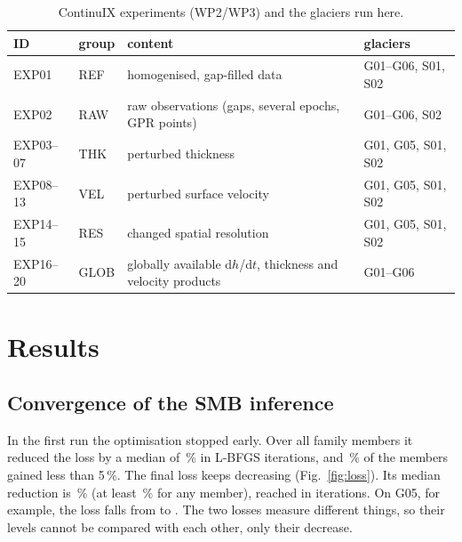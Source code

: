 \documentclass[10pt,a4paper]{article}
\begin{document}
\begin{table}[!htb]
\centering\small
\caption{ContinuIX experiments (WP2/WP3) and the glaciers run here.}
\label{tab:exp}
\begin{tabular}{lll l}
\toprule
ID & group & content & glaciers \\
\midrule
EXP01 & REF & homogenised, gap-filled data & G01--G06, S01, S02 \\
EXP02 & RAW & raw observations (gaps, several epochs, GPR points) & G01--G06, S02 \\
EXP03--07 & THK & perturbed thickness & G01, G05, S01, S02 \\
EXP08--13 & VEL & perturbed surface velocity & G01, G05, S01, S02 \\
EXP14--15 & RES & changed spatial resolution & G01, G05, S01, S02 \\
EXP16--20 & GLOB & globally available d$h$/d$t$, thickness and velocity products & G01--G06 \\
\bottomrule
\end{tabular}
\end{table}

\begin{table}[!htb]
\centering\small
\caption{Glaciers. Window = inversion period ($t_1$--$t_2$; a 10-yr window is assumed for the synthetic cases);
ice cells on the model grid; ``seg.'' = number of connected GPR profile segments.}
\label{tab:glaciers}
\setlength{\tabcolsep}{4pt}

\end{table}

\section{Results}

\subsection{Convergence of the SMB inference}
In the first run the optimisation stopped early. Over all  family members it reduced the loss by a median of
\,\% in  L-BFGS iterations, and \,\% of the members gained less
than 5\,\%. The final loss keeps decreasing (Fig.~\ref{fig:loss}). Its median reduction is \,\%
(at least \,\% for any member), reached in  iterations. On G05, for example, the
loss falls from  to . The two losses measure different things, so their levels
cannot be compared with each other, only their decrease.
\end{document}
